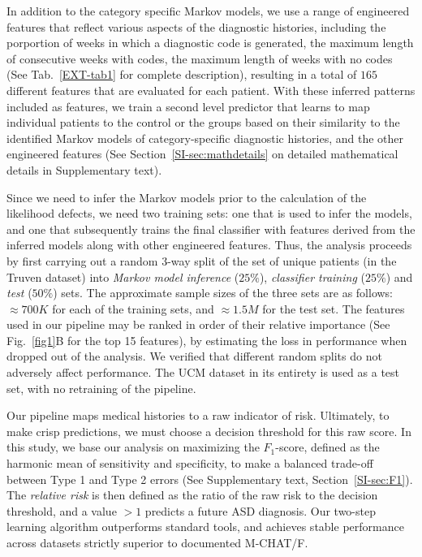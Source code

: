 \documentclass[onecolumn,10pt]{IEEEtran}
\begin{document}
In addition to the category specific Markov models, we use a range of engineered features that reflect various aspects of the diagnostic histories, including the porportion of weeks in which a diagnostic code is generated, the maximum length of consecutive weeks with codes, the maximum length of weeks with no codes (See Tab.~\ref{EXT-tab1} for complete description), resulting in a total of $165$ different features that are evaluated for each patient. With these inferred patterns included as features,  we train a second level predictor that learns to map   individual patients  to the control or the \treatment groups based on their  similarity  to the identified  Markov models of category-specific diagnostic histories, and the other engineered features (See Section~\ref{SI-sec:mathdetails} on detailed mathematical details  in Supplementary  text).


Since we need to infer the Markov models prior to the calculation of the likelihood defects, we need two training sets: one that is used to infer the models, and one that subsequently trains the final classifier  with features  derived  from the inferred models along with other engineered features. Thus, the analysis proceeds by first carrying out a random 3-way split of the set of unique patients (in the Truven dataset) into \textit{Markov model inference} ($25\%$), \textit{classifier training} ($25\%$) and \textit{test} ($50\%$) sets. The approximate sample sizes of the three sets are as follows: $\approx 700K$ for each of  the training sets, and $\approx 1.5M$ for the test set. The features used in our pipeline may be ranked in order of their relative importance (See Fig.~\ref{fig1}B for the top 15 features), by
estimating the loss in performance when dropped out of the analysis. We verified that different random splits do not adversely affect performance. The UCM dataset in its entirety is used as a test set, with no retraining of the pipeline.

Our pipeline maps medical histories to a   raw indicator of 
risk. Ultimately, to make crisp predictions, we must choose  a decision threshold for this raw score. In this study, we base our analysis on maximizing the $F_1$-score, defined as the harmonic mean of sensitivity and specificity, to make a   balanced trade-off between Type 1 and Type 2 errors (See Supplementary text, Section~\ref{SI-sec:F1}). The \textit{relative risk} is then defined as the ratio of the raw  risk to the  decision threshold, and a value  $>1$  predicts a future ASD diagnosis. Our two-step learning algorithm outperforms standard tools, and achieves  stable performance across datasets strictly superior to documented M-CHAT/F.
\end{document}
